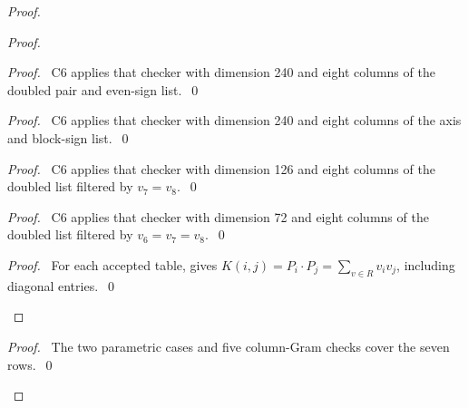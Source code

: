 \begin{proof}
\begin{proof}
  \begin{proof}\pf\ C6 applies that checker with dimension 240 and eight columns
   of the doubled pair and even-sign list.~\qed\end{proof}
  \begin{proof}\pf\ C6 applies that checker with dimension 240 and eight columns
   of the axis and block-sign list.~\qed\end{proof}
  \begin{proof}\pf\ C6 applies that checker with dimension 126 and eight columns
   of the doubled list filtered by $v_7=v_8$.~\qed\end{proof}
  \begin{proof}\pf\ C6 applies that checker with dimension 72 and eight columns
   of the doubled list filtered by $v_6=v_7=v_8$.~\qed\end{proof}
  \qedstep
  \begin{proof}\pf\ For each accepted table,
    gives
   $K(i,j)=P_i\cdot P_j=\sum_{v\in R}v_iv_j$, including diagonal entries.~\qed\end{proof}
 \end{proof}
 \qedstep
 \begin{proof}\pf\ The two parametric cases and five column-Gram checks cover
  the seven rows.~\qed\end{proof}
\end{proof}

